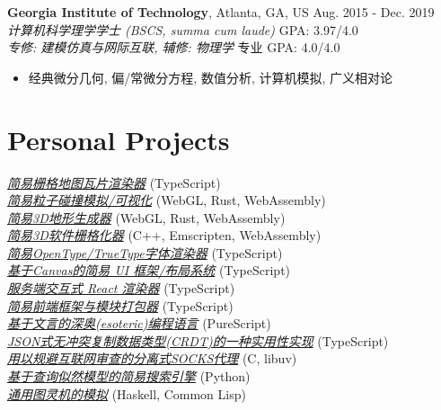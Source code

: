 \documentclass[12pt]{article}
\begin{document}
\textbf{Georgia Institute of Technology}, Atlanta, GA, US \hfill Aug. 2015 - Dec. 2019\\
\textit{计算机科学理学学士 (BSCS, \textit{summa cum laude})} \hfill GPA: 3.97/4.0\\
\textit{专修: 建模仿真与网际互联, 辅修: 物理学} \hfill 专业 GPA: 4.0/4.0
\begin{itemize}
\small
\item 经典微分几何, 偏/常微分方程, 数值分析, 计算机模拟, 广义相对论
\end{itemize}

\section*{Personal Projects}
\href{https://galmungral.github.io/mercator}{\textit{简易栅格地图瓦片渲染器}} \hfill (TypeScript) \\
\href{https://galmungral.github.io/particle-simulation}{\textit{简易粒子碰撞模拟/可视化}} 
\hfill (WebGL, Rust, WebAssembly) \\
\href{https://galmungral.github.io/terrain-generator}{\textit{简易3D地形生成器}} \hfill (WebGL, Rust, WebAssembly) \\
\href{https://galmungral.github.io/rasterizer?file=billboard.txt}{\textit{简易3D软件栅格化器}} \hfill (C++, Emscripten, WebAssembly) \\
\href{https://galmungral.github.io/text2svg}{\textit{简易OpenType/TrueType字体渲染器}} \hfill (TypeScript) \\
\href{https://galmungral.github.io/michelangelo}{\textit{基于Canvas的简易 UI 框架/布局系统}} \hfill (TypeScript) \\
\href{https://github.com/galmungral/react-teletype}{\textit{服务端交互式 React 渲染器}} \hfill (TypeScript) \\
\href{https://github.com/galmungral/replay}{\textit{简易前端框架与模块打包器}} \hfill (TypeScript) \\
\href{https://galmungral.github.io/hanbun-lang}{\textit{基于文言的深奥(esoteric)编程语言}} \hfill (PureScript) \\
\href{https://github.com/galmungral/json-crdt}{\textit{JSON式无冲突复制数据类型(CRDT)的一种实用性实现}} \hfill (TypeScript) \\
\href{https://github.com/galmungral/telescope}{\textit{用以规避互联网审查的分离式SOCKS代理}} \hfill (C, libuv) \\
\href{https://github.com/galmungral/plato}{\textit{基于查询似然模型的简易搜索引擎}} \hfill (Python) \\
\href{https://github.com/galmungral/turing-machine}{\textit{通用图灵机的模拟}} \hfill (Haskell, Common Lisp)
\end{document}
